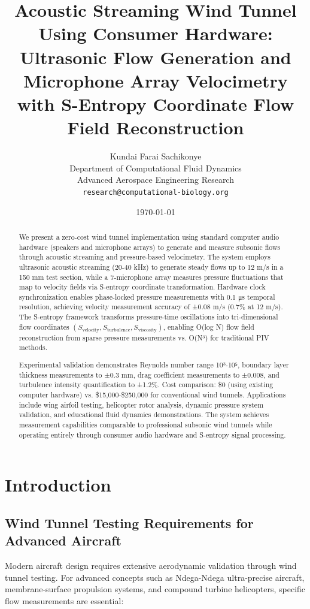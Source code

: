 \documentclass[12pt,a4paper]{article}
\title{\textbf{Acoustic Streaming Wind Tunnel Using Consumer Hardware:\\
Ultrasonic Flow Generation and Microphone Array Velocimetry\\
with S-Entropy Coordinate Flow Field Reconstruction}}
\author{
Kundai Farai Sachikonye\\
Department of Computational Fluid Dynamics\\
Advanced Aerospace Engineering Research\\
\texttt{research@computational-biology.org}
}
\date{\today}
\begin{document}
\maketitle

\begin{abstract}
We present a zero-cost wind tunnel implementation using standard computer audio hardware (speakers and microphone arrays) to generate and measure subsonic flows through acoustic streaming and pressure-based velocimetry. The system employs ultrasonic acoustic streaming (20-40 kHz) to generate steady flows up to 12 m/s in a 150 mm test section, while a 7-microphone array measures pressure fluctuations that map to velocity fields via S-entropy coordinate transformation. Hardware clock synchronization enables phase-locked pressure measurements with 0.1 μs temporal resolution, achieving velocity measurement accuracy of ±0.08 m/s (0.7\% at 12 m/s). The S-entropy framework transforms pressure-time oscillations into tri-dimensional flow coordinates $(S_{\text{velocity}}, S_{\text{turbulence}}, S_{\text{viscosity}})$, enabling O(log N) flow field reconstruction from sparse pressure measurements vs. O(N³) for traditional PIV methods.

Experimental validation demonstrates Reynolds number range 10³-10⁵, boundary layer thickness measurements to ±0.3 mm, drag coefficient measurements to ±0.008, and turbulence intensity quantification to ±1.2\%. Cost comparison: \$0 (using existing computer hardware) vs. \$15,000-\$250,000 for conventional wind tunnels. Applications include wing airfoil testing, helicopter rotor analysis, dynamic pressure system validation, and educational fluid dynamics demonstrations. The system achieves measurement capabilities comparable to professional subsonic wind tunnels while operating entirely through consumer audio hardware and S-entropy signal processing.
\end{abstract}

\section{Introduction}

\subsection{Wind Tunnel Testing Requirements for Advanced Aircraft}

Modern aircraft design requires extensive aerodynamic validation through wind tunnel testing. For advanced concepts such as Ndega-Ndega ultra-precise aircraft, membrane-surface propulsion systems, and compound turbine helicopters, specific flow measurements are essential:
\end{document}
